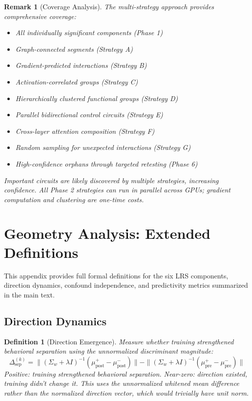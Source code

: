 \documentclass[11pt]{article}
\newtheorem{definition}{Definition}[section]
\newtheorem{remark}{Remark}[section]
\begin{document}
\begin{remark}[Coverage Analysis]
The multi-strategy approach provides comprehensive coverage:
\begin{itemize}[nosep]
\item All individually significant components (Phase 1)
\item Graph-connected segments (Strategy A)
\item Gradient-predicted interactions (Strategy B)
\item Activation-correlated groups (Strategy C)
\item Hierarchically clustered functional groups (Strategy D)
\item Parallel bidirectional control circuits (Strategy E)
\item Cross-layer attention composition (Strategy F)
\item Random sampling for unexpected interactions (Strategy G)
\item High-confidence orphans through targeted retesting (Phase 6)
\end{itemize}
Important circuits are likely discovered by multiple strategies, increasing confidence. All Phase 2 strategies can run in parallel across GPUs; gradient computation and clustering are one-time costs.
\end{remark}

\section{Geometry Analysis: Extended Definitions}
\label{app:geometry-detail}

This appendix provides full formal definitions for the six LRS components, direction dynamics, confound independence, and predictivity metrics summarized in the main text.

\subsection{Direction Dynamics}

\begin{definition}[Direction Emergence]
Measure whether training strengthened behavioral separation using the unnormalized discriminant magnitude:
\begin{equation}
\Delta_{\text{sep}}^{(k)} = \|(\Sigma_w + \lambda I)^{-1}(\mu^+_{\text{post}} - \mu^-_{\text{post}})\| - \|(\Sigma_w + \lambda I)^{-1}(\mu^+_{\text{pre}} - \mu^-_{\text{pre}})\|
\end{equation}
Positive: training strengthened behavioral separation. Near-zero: direction existed, training didn't change it. This uses the unnormalized whitened mean difference rather than the normalized direction vector, which would trivially have unit norm.
\end{definition}
\end{document}
